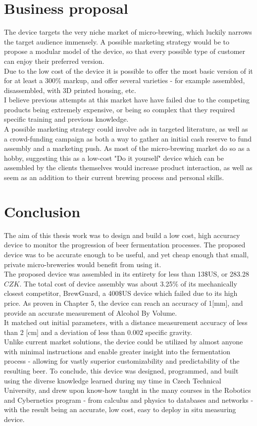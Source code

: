 \documentclass[twoside]{ctuthesis}
\theoremstyle{plain}
\theoremstyle{definition}
\theoremstyle{note}
\begin{document}
\section{Business proposal}
The device targets the very niche market of micro-brewing, which luckily narrows the target audience immensely. A possible marketing strategy would be to propose a modular model of the device, so that every possible type of customer can enjoy their preferred version.\\
Due to the low cost of the device it is possible to offer the most basic version of it for at least a 300$\%$ markup, and offer several varieties - for example assembled, disassembled, with 3D printed housing, etc.\\
I believe previous attempts at this market have have failed due to the competing products being extremely expensive, or being so complex that they required specific training and previous knowledge.\\
A possible marketing strategy could involve ads in targeted literature, as well as a crowd-funding campaign as both a way to gather an initial cash reserve to fund assembly and a marketing push. As most of the micro-brewing market do so as a hobby, suggesting this as a low-cost "Do it yourself" device which can be assembled by the clients themselves would increase product interaction, as well as seem as an addition to their current brewing process and personal skills.

\section{Conclusion}
The aim of this thesis work was to design and build a low cost, high accuracy device to monitor the progression of beer fermentation processes. The proposed device was to be accurate enough to be useful, and yet cheap enough that small, private micro-breweries would benefit from using it.\\ 
The proposed device was assembled in its entirety for less than 13$\$$US, or 283.28 $CZK$. The total cost of device assembly was about 3.25$\%$ of its mechanically closest competitor, BrewGuard, a 400$\$$US device which failed due to its high price. As proven in Chapter 5, the device can reach an accuracy of 1[mm], and provide an accurate measurement of Alcohol By Volume.\\
It matched out initial parameters, with a distance measurement accuracy of less than 2 [cm] and a deviation of less than 0.002 specific gravity.\\
Unlike current market solutions, the device could be utilized by almost anyone with minimal instructions and enable greater insight into the fermentation process - allowing for vastly superior customizability and predictability of the resulting beer.
To conclude, this device was designed, programmed, and built using the diverse knowledge learned during my time in Czech Technical University, and drew upon know-how taught in the many courses in the Robotics and Cybernetics program - from calculus and physics to databases and networks - with the result being an accurate, low cost, easy to deploy in situ measuring device.
\end{document}
